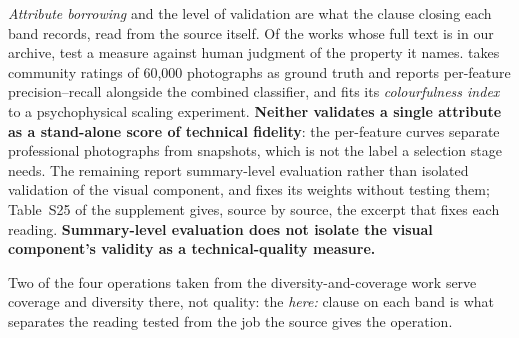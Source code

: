 \emph{Attribute borrowing} and the level of validation are what the clause closing each
band records, read from the source itself. Of the
\valComPdf{} works whose full text is in our archive, \valPropriedade{} test a measure against human
judgment of the property it names.
\citet{ke2006highlevel} takes community ratings of 60{,}000 photographs as ground truth
and reports per-feature precision--recall alongside the combined classifier, and
\citet{hasler2003colorfulness} fits its \emph{colourfulness index} to a psychophysical
scaling experiment. \textbf{Neither validates a single attribute as a stand-alone score of
technical fidelity}: the per-feature curves separate professional photographs from
snapshots, which is not the label a selection stage needs. The remaining \valSoResumo{} report summary-level evaluation rather than isolated
validation of the visual component, and \citet{korolkov2025keyframe} fixes its weights without testing
them; Table~S25 of the supplement gives, source by source, the excerpt that fixes each
reading. \textbf{Summary-level evaluation does not isolate the visual component's validity as a
technical-quality measure.}

Two of the four operations taken from the diversity-and-coverage work serve coverage and
diversity there, not quality: the \emph{here:} clause on each band is what separates the
reading tested from the job the source gives the operation.

\FloatBarrier
